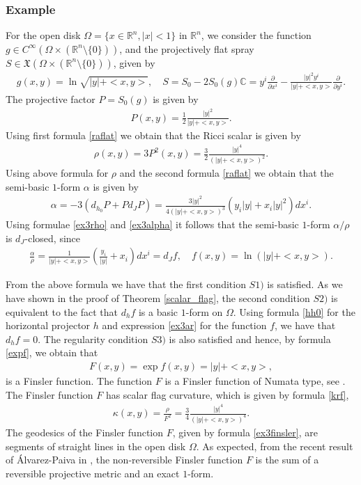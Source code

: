 \documentclass[oneside,english]{amsart}
\numberwithin{equation}{section}
\numberwithin{figure}{section}
\theoremstyle{plain}
\theoremstyle{plain}
\theoremstyle{definition}
\theoremstyle{plain}
\theoremstyle{plain}
\theoremstyle{plain}
\theoremstyle{remark}
\theoremstyle{remark}
\begin{document}
\subsubsection{Example} \label{ssc:ex3} For the open disk $\Omega=\{x\in
\mathbb{R}^n, |x|<1\}$ in $\mathbb{R}^n$, we consider the function
$g \in C^{\infty}(\Omega \times
(\mathbb{R}^n\setminus\{0\}))$, and the projectively flat  spray
$S\in \mathfrak{X}(\Omega \times
(\mathbb{R}^n\setminus\{0\}))$, given by 
\begin{eqnarray}
  g(x,y)=\ln \sqrt{|y|+<x,y>}, \quad
  S=S_0-2S_0(g)\mathbb{C}=y^i\frac{\partial}{\partial x^i} -
  \frac{|y|^2y^i}{|y|+<x,y>} \frac{\partial}{\partial y^i}. \label{ex3g}
\end{eqnarray} 
The projective factor $P=S_0(g)$ is given by 
\begin{eqnarray*}
  P(x,y)=\frac{1}{2}\frac{|y|^2}{|y|+<x,y>}. \end{eqnarray*}
Using first formula \eqref{raflat} we obtain that the Ricci scalar is
given by 
\begin{eqnarray}
  \rho(x,y)=3P^2(x,y) =
  \frac{3}{2}\frac{|y|^4}{(|y|+<x,y>)^2}. \label{ex3rho} \end{eqnarray}
Using above formula for $\rho$ and the second formula \eqref{raflat} we obtain that the semi-basic
$1$-form $\alpha$ is given by 
\begin{eqnarray}
  \alpha = -3(d_{h_0}P + Pd_JP)= \frac{3|y|^2}{4(|y|+<x,y>)^3}(y_i|y| +
  x_i|y|^2)dx^i. \label{ex3alpha} \end{eqnarray} 
Using formulae \eqref{ex3rho} and \eqref{ex3alpha} it follows that the
semi-basic $1$-form $\alpha/\rho$ is $d_J$-closed, since 
\begin{eqnarray}
  \frac{\alpha}{\rho} = \frac{1}{|y|+<x,y>}\left(\frac{y_i}{|y|} +
    x_i\right)dx^i = d_J f, \quad f(x,y)=\ln(|y|+<x,y>). \label{ex3ar} \end{eqnarray}

From the above formula we have that the first condition $S1)$ is
satisfied. As we have shown in the proof of Theorem \ref{scalar_flag},
the second condition $S2)$ is equivalent to the fact that $d_hf$ is a basic
$1$-form on $\Omega$. Using formula \eqref{hh0} for the horizontal
projector $h$ and expression \eqref{ex3ar} for the function $f$, we
have that $d_hf=0$. The regularity condition $S3)$ is also satisfied
and hence, by formula \eqref{expf}, we obtain that 
\begin{eqnarray}
  F(x,y)=\exp f(x,y)=|y|+<x,y>, \label{ex3finsler} \end{eqnarray} is a
Finsler function. The function $F$ is a Finsler function of Numata
type, see \cite[3.9. B]{BCS00}. The Finsler function $F$ has scalar
flag curvature, which is given by
formula \eqref{krf}, 
\begin{eqnarray}
  \kappa(x,y)=\frac{\rho}{F^2} =
  \frac{3}{4}\frac{|y|^4}{(|y|+<x,y>)^4}. \label{ex3sf}\end{eqnarray}  
The geodesics of the Finsler function $F$, given by formula \eqref{ex3finsler}, are segments of straight
lines in the open disk $\Omega$.  As expected, from the recent result of
\'Alvarez-Paiva in \cite{Alvarez13}, the non-reversible Finsler
function $F$ is the sum of a reversible projective metric and an exact
$1$-form.  
\end{document}
